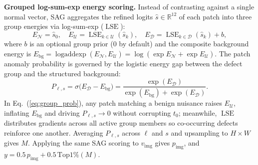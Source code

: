 \documentclass[conference]{IEEEtran}
\newcommand{\sag}{SAG}
\newcommand{\lse}{\operatorname{LSE}}
\begin{document}
\textbf{Grouped log-sum-exp energy scoring.} Instead of contrasting against a single normal vector, \sag{} aggregates the refined logits $\hat{s} \in \mathbb{R}^{12}$ of each patch into three group energies via log-sum-exp ($\lse$):
\begin{equation}
E_{\mathcal{N}} = \hat{s}_0, \quad E_{\mathcal{U}} = \lse_{k \in \mathcal{U}}(\hat{s}_k), \quad E_{\mathcal{D}} = \lse_{k \in \mathcal{D}}(\hat{s}_k) + b,
\end{equation}
where $b$ is an optional group prior ($0$ by default) and the composite background energy is $E_{\mathrm{bg}} = \operatorname{logaddexp}(E_{\mathcal{N}}, E_{\mathcal{U}}) = \log(\exp E_{\mathcal{N}} + \exp E_{\mathcal{U}})$. The patch anomaly probability is governed by the logistic energy gap between the defect group and the structured background:
\begin{equation}
P_{\ell,s} = \sigma\big(E_{\mathcal{D}} - E_{\mathrm{bg}}\big) = \frac{\exp(E_{\mathcal{D}})}{\exp(E_{\mathrm{bg}}) + \exp(E_{\mathcal{D}})}.
\label{eq:group_prob}
\end{equation}
In Eq.~(\ref{eq:group_prob}), any patch matching a benign nuisance raises $E_{\mathcal{U}}$, inflating $E_{\mathrm{bg}}$ and driving $P_{\ell,s} \to 0$ without corrupting $t_0$; meanwhile, $\lse$ distributes gradients across all active group members so co-occurring defects reinforce one another. Averaging $P_{\ell,s}$ across $\ell$ and $s$ and upsampling to $H{\times}W$ gives $M$. Applying the same \sag{} scoring to $v_{\mathrm{img}}$ gives $p_{\mathrm{img}}$, and $y = 0.5\,p_{\mathrm{img}} + 0.5\,\mathrm{Top1\%}(M)$.
\end{document}
